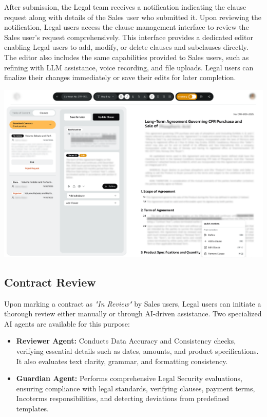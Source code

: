 After submission, the Legal team receives a notification indicating the clause request along with details of the Sales user who submitted it. Upon reviewing the notification, Legal users access the clause management interface to review the Sales user's request comprehensively. This interface provides a dedicated editor enabling Legal users to add, modify, or delete clauses and subclauses directly. The editor also includes the same capabilities provided to Sales users, such as refining with LLM assistance, voice recording, and file uploads. Legal users can finalize their changes immediately or save their edits for later completion.

\begin{center}
    \centering
    \includegraphics[width=1\textwidth]{Images/Clause Requests - Respond to a Request.png}
    \label{fig:clause_request_review_interface}
\end{center}

\subsection{Contract Review}
Upon marking a contract as \textit{"In Review"} by Sales users, Legal users can initiate a thorough review either manually or through AI-driven assistance. Two specialized AI agents are available for this purpose:

\begin{itemize}
    \item \textbf{Reviewer Agent:} Conducts Data Accuracy and Consistency checks, verifying essential details such as dates, amounts, and product specifications. It also evaluates text clarity, grammar, and formatting consistency.
    \item \textbf{Guardian Agent:} Performs comprehensive Legal Security evaluations, ensuring compliance with legal standards, verifying clauses, payment terms, Incoterms responsibilities, and detecting deviations from predefined templates.
\end{itemize}

